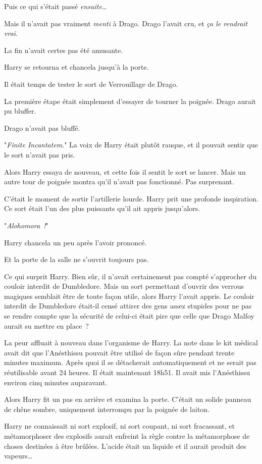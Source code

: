 Puis ce qui s'était passé \emph{ensuite}…

Mais il n'avait pas vraiment \emph{menti} à Drago. Drago l'avait cru, et \emph{ça le rendrait vrai}.

La fin n'avait certes pas été amusante.

Harry se retourna et chancela jusqu'à la porte.

Il était temps de tester le sort de Verrouillage de Drago.

La première étape était simplement d'essayer de tourner la poignée. Drago aurait pu bluffer.

Drago n'avait pas bluffé.

"\emph{Finite Incantatem}." La voix de Harry était plutôt rauque, et il pouvait sentir que le sort n'avait pas pris.

Alors Harry essaya de nouveau, et cette fois il sentit le sort se lancer. Mais un autre tour de poignée montra qu'il n'avait pas fonctionné. Pas surprenant.

C'était le moment de sortir l'artillerie lourde. Harry prit une profonde inspiration. Ce sort était l'un des plus puissants qu'il ait appris jusqu'alors.

"\emph{Alohomora~!}"

Harry chancela un peu après l'avoir prononcé.

Et la porte de la salle ne s'ouvrit toujours pas.

Ce qui surprit Harry. Bien sûr, il n'avait certainement pas compté s'approcher du couloir interdit de Dumbledore. Mais un sort permettant d'ouvrir des verrous magiques semblait être de toute façon utile, alors Harry l'avait appris. Le couloir interdit de Dumbledore était-il censé attirer des gens assez stupides pour ne pas se rendre compte que la sécurité de celui-ci était pire que celle que Drago Malfoy aurait su mettre en place~?

La peur affluait à nouveau dans l'organisme de Harry. La note dans le kit médical avait dit que l'Anésthissu pouvait être utilisé de façon sûre pendant trente minutes maximum. Après quoi il se détacherait automatiquement et ne serait pas réutilisable avant 24 heures. Il était maintenant 18h51. Il avait mis l'Anésthissu environ cinq minutes auparavant.

Alors Harry fit un pas en arrière et examina la porte. C'était un solide panneau de chêne sombre, uniquement interrompu par la poignée de laiton.

Harry ne connaissait ni sort explosif, ni sort coupant, ni sort fracassant, et métamorphoser des explosifs aurait enfreint la règle contre la métamorphose de choses destinées à être brûlées. L'acide était un liquide et il aurait produit des vapeurs…

